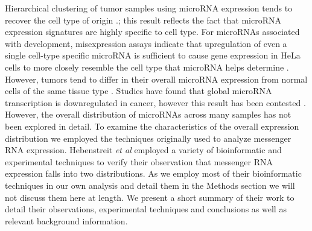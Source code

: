 \documentclass[12pt]{report}
\begin{document}
Hierarchical clustering of tumor samples using microRNA expression tends to recover the cell type of origin \cite{Gaur2007}.; this 
result reflects the fact that microRNA expression signatures are highly specific 
to cell type. For microRNAs associated with development,
misexpression assays indicate that upregulation of even a 
single cell-type specific microRNA is sufficient to cause gene expression in HeLa cells to 
more closely resemble the cell type that microRNA helps determine \cite{Gaur2007}. However, 
tumors tend to differ in their overall microRNA expression from normal cells of the same tissue 
type \cite{Gaur2007}. Studies have found that global microRNA transcription is downregulated in cancer, 
however this result has been contested \cite{Bushati2007}. However, the overall distribution of 
microRNAs across many samples has not been explored in detail. To examine the 
characteristics of the overall expression distribution we employed the 
techniques originally used to analyze messenger RNA expression.
Hebenstreit \emph{et al} employed a variety of bioinformatic and experimental 
techniques to verify their observation that messenger RNA expression falls into 
two distributions. As we employ most of their bioinformatic techniques in our 
own analysis and detail them in the Methods section we will not discuss them here at length.
We present a short summary of their work to detail their observations, experimental techniques 
and conclusions as well as relevant background information.
 
\end{document}
